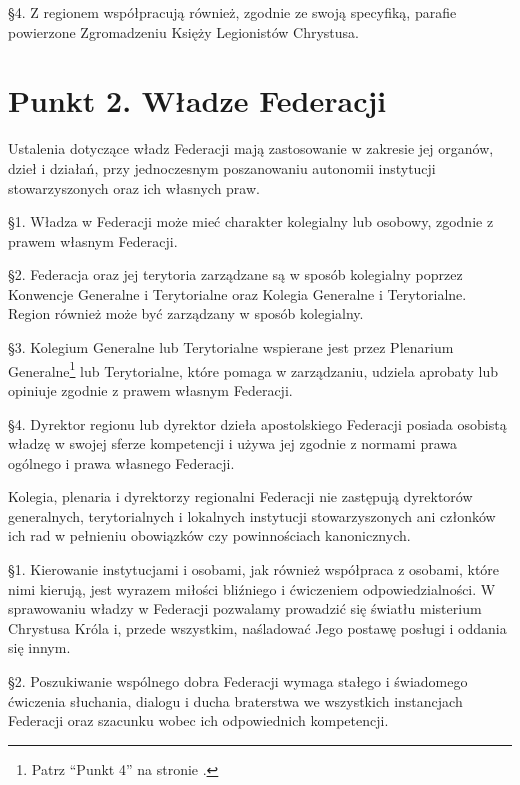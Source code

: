 \S{}4. Z regionem współpracują również, zgodnie ze swoją specyfiką, parafie powierzone Zgromadzeniu Księży Legionistów Chrystusa.


\section{Punkt 2. Władze Federacji}
 
 
 Ustalenia dotyczące władz Federacji mają zastosowanie w zakresie jej organów, dzieł i działań, przy jednoczesnym poszanowaniu autonomii instytucji stowarzyszonych oraz ich własnych praw.
 
 \S{}1. Władza w Federacji może mieć charakter kolegialny lub osobowy, zgodnie z prawem własnym Federacji.


\S{}2. Federacja oraz jej terytoria zarządzane są w sposób kolegialny poprzez Konwencje Generalne i Terytorialne oraz Kolegia Generalne i Terytorialne. Region również może być zarządzany w sposób kolegialny.


\S{}3. Kolegium Generalne lub Terytorialne wspierane jest przez Plenarium Generalne\footnote{Patrz “Punkt 4” na stronie \pageref{lbl-plenarium-generalne}.} lub Terytorialne, które pomaga w zarządzaniu, udziela aprobaty lub opiniuje zgodnie z prawem własnym Federacji.


\S{}4. Dyrektor regionu lub dyrektor dzieła apostolskiego Federacji posiada osobistą władzę w swojej sferze kompetencji i używa jej zgodnie z normami prawa ogólnego i prawa własnego Federacji.
 
 Kolegia, plenaria i dyrektorzy regionalni Federacji nie zastępują dyrektorów generalnych, terytorialnych i lokalnych instytucji stowarzyszonych ani członków ich rad w pełnieniu obowiązków czy powinnościach kanonicznych.
 
 
 \S{}1. Kierowanie instytucjami i osobami, jak również współpraca z osobami, które nimi kierują, jest wyrazem miłości bliźniego i ćwiczeniem odpowiedzialności. W sprawowaniu władzy w Federacji pozwalamy prowadzić się światłu misterium Chrystusa Króla i, przede wszystkim, naśladować Jego postawę posługi i oddania się innym.


\S{}2. Poszukiwanie wspólnego dobra Federacji wymaga stałego i świadomego ćwiczenia słuchania, dialogu i ducha braterstwa we wszystkich instancjach Federacji oraz szacunku wobec ich odpowiednich kompetencji.


